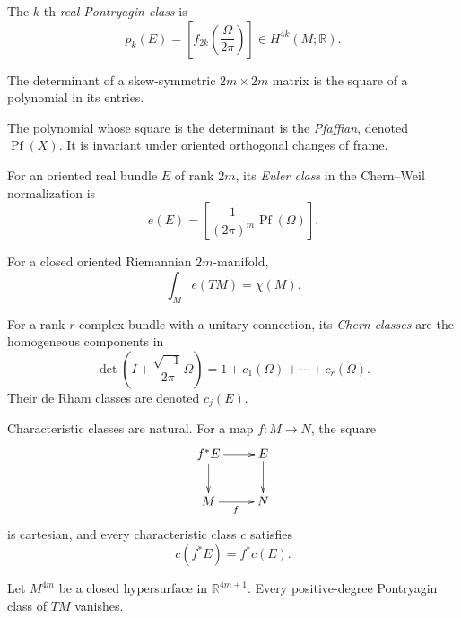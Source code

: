 \begin{definition}
\label{at-definition-pontryagin-class}
The $k$-th \emph{real Pontryagin class} is
$$
p_k(E)=
\left[
f_{2k}\left(\frac{\Omega}{2\pi}\right)
\right]
\in H^{4k}(M;\mathbb{R}).
$$
\end{definition}

\begin{proposition}
\label{at-proposition-skew-det-square}
The determinant of a skew-symmetric
$2m\times2m$ matrix is the square of a
polynomial in its entries.
\end{proposition}

\begin{definition}
\label{at-definition-pfaffian}
The polynomial whose square is the
determinant
is the \emph{Pfaffian}, denoted
$\operatorname{Pf}(X)$.  It is invariant
under oriented orthogonal changes of frame.
\end{definition}

\begin{definition}
\label{at-definition-euler-class-curvature}
For an oriented real bundle $E$ of rank
$2m$, its \emph{Euler class} in the
Chern--Weil normalization is
$$
e(E)=\left[
\frac{1}{(2\pi)^m}
\operatorname{Pf}(\Omega)
\right].
$$
\end{definition}

\begin{theorem}
\label{at-theorem-chern-gauss-bonnet}
For a closed oriented Riemannian
$2m$-manifold,
$$
\int_M e(TM)=\chi(M).
$$
\end{theorem}

\begin{definition}
\label{at-definition-chern-classes}
For a rank-$r$ complex bundle with a unitary
connection, its \emph{Chern classes} are the
homogeneous components in
$$
\det\left(I+\frac{\sqrt{-1}}{2\pi}
\Omega\right)
=1+c_1(\Omega)+\cdots+c_r(\Omega).
$$
Their de Rham classes are denoted $c_j(E)$.
\end{definition}

Characteristic classes are natural.  For a
map $f:M\longrightarrow N$, the square
$$
\xymatrix{
f^*E\ar[r]\ar[d]&E\ar[d]\\
M\ar[r]_f&N
}
$$
is cartesian, and every characteristic class
$c$ satisfies
$$
c(f^*E)=f^*c(E).
$$

\begin{proposition}
\label{at-proposition-hypersurface-p-class}
Let $M^{4m}$ be a closed hypersurface in
$\mathbb{R}^{4m+1}$.  Every positive-degree
Pontryagin class of $TM$ vanishes.
\end{proposition}

